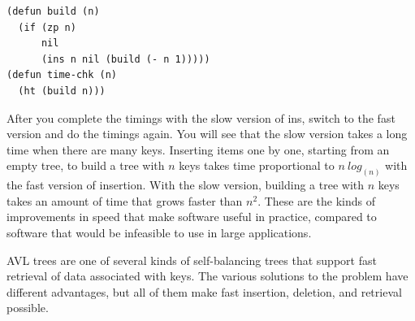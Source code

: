 \begin{center}
\begin{code}
\begin{verbatim}
(defun build (n)
  (if (zp n)
      nil
      (ins n nil (build (- n 1)))))
(defun time-chk (n)
  (ht (build n)))
\end{verbatim}
\end{code}
\end{center}

After you complete the timings with the slow version of \textsf{ins},
switch to the fast version and do the timings again.
You will see that the slow version takes a long time
when there are many keys.
Inserting items one by one, starting from an empty tree,
to build a tree with $n$ keys takes time proportional to $n~log_(n)$
with the fast version of insertion.
With the slow version,
building a tree with $n$ keys takes an amount of time
that grows faster than $n^2$.
These are the kinds of improvements in speed that
make software useful in practice, compared to software
that would be infeasible to use in large applications.

AVL trees are one of several kinds of self-balancing
trees that support fast retrieval of data associated with keys.
The various solutions to the problem have different advantages,
but all of them make fast insertion, deletion, and retrieval possible.

